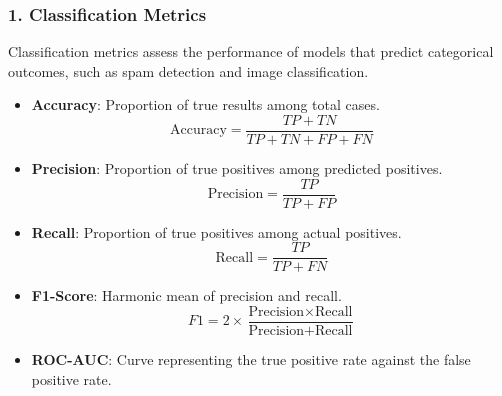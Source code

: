 \documentclass{beamer}
\begin{document}
\begin{frame}[fragile]
    \frametitle{1. Classification Metrics}
    Classification metrics assess the performance of models that predict categorical outcomes, such as spam detection and image classification.

    \begin{itemize}
        \item \textbf{Accuracy}: Proportion of true results among total cases.
        \begin{equation}
            \text{Accuracy} = \frac{TP + TN}{TP + TN + FP + FN}
        \end{equation}
        
        \item \textbf{Precision}: Proportion of true positives among predicted positives.
        \begin{equation}
            \text{Precision} = \frac{TP}{TP + FP}
        \end{equation}
        
        \item \textbf{Recall}: Proportion of true positives among actual positives.
        \begin{equation}
            \text{Recall} = \frac{TP}{TP + FN}
        \end{equation}
        
        \item \textbf{F1-Score}: Harmonic mean of precision and recall.
        \begin{equation}
            F1 = 2 \times \frac{\text{Precision} \times \text{Recall}}{\text{Precision} + \text{Recall}}
        \end{equation}
        
        \item \textbf{ROC-AUC}: Curve representing the true positive rate against the false positive rate.
    \end{itemize}
\end{frame}
\end{document}
